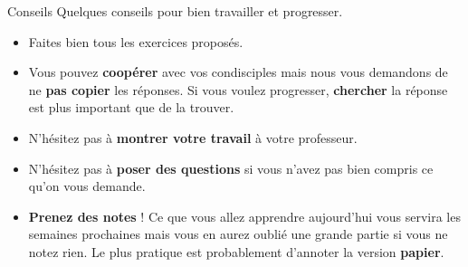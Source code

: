 \documentclass[a4paper,11pt]{style-esi/td}
\begin{document}
\entete
\titre
{}
\lastedit

\bigskip
\tableofcontents

\vfill
\begin{coltbox}{Conseils}
	Quelques conseils pour bien travailler et progresser.
	\begin{itemize}
	\item 
		Faites bien tous les exercices proposés.
	\item 
		Vous pouvez \textbf{coopérer} avec vos condisciples 
		mais nous vous demandons de ne \textbf{pas copier} les réponses. 
		Si vous voulez progresser, \textbf{chercher} la réponse est plus important que de la trouver. 
	\item 
		N'hésitez pas à \textbf{montrer votre travail} à votre professeur.
	\item 
		N'hésitez pas à \textbf{poser des questions} 
		si vous n'avez pas bien compris ce qu'on vous demande.
	\item 
		\textbf{Prenez des notes} ! 
		Ce que vous allez apprendre aujourd'hui 
		vous servira les semaines prochaines 
		mais vous en aurez oublié une grande partie si vous ne notez rien. 
		Le plus pratique est probablement d'annoter la version \textbf{papier}. 
	\end{itemize}
\end{coltbox}
\vfill




\end{document}

